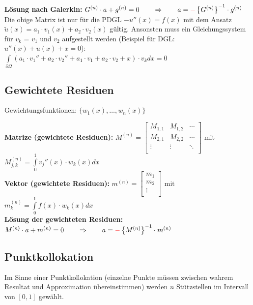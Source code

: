 \textbf{Lösung nach Galerkin:} $G^{(n)}\cdot a+g^{(n)}=0\qquad \Rightarrow
\qquad a=\textcolor{red}{\mathbf{-}}\left\{G^{(n)}\right\}^{-1}\cdot g^{(n)}$\\

Die obige Matrix ist nur für die PDGL $-u''(x) = f(x)$ mit dem Ansatz
$\tilde{u}(x) = a_1 \cdot v_1(x) + a_2 \cdot v_2(x)$ gültig. Ansonsten muss ein
Gleichungssystem für $v_k$ = $v_1$ und $v_2$ aufgestellt werden (Beispiel
für DGL: $u''(x) + u(x) + x = 0$):\\
$\int\limits_{\partial \Omega}{(a_1 \cdot v_1'' + a_2 \cdot v_2'' + a_1 \cdot
v_1 + a_2 \cdot v_2 + x) \cdot v_k dx} = 0$

\subsection{Gewichtete Residuen}
Gewichtungsfunktionen: $\{w_1(x),\ldots,w_n(x)\}$

\textbf{Matrize (gewichtete Residuen): }
$M^{(n)}=\begin{bmatrix}
	M_{1,1}& M_{1,2}&\cdots\\
	M_{2,1}& M_{2,2}&\cdots\\
	\vdots & \vdots &\ddots\\
\end{bmatrix}$ \qquad mit \qquad $M_{j,k}^{(n)}=\int\limits_{0}^{1}{v_j''(x)\cdot w_k(x) dx}$\\
\textbf{Vektor (gewichtete Residuen): } 
$m^{(n)}=\begin{bmatrix}
	m_1\\
	m_2\\
	\vdots\\
\end{bmatrix}$ \qquad mit \qquad $m_{k}^{(n)}=\int\limits_{0}^{1}{f(x)\cdot w_k(x) dx}$\\

\textbf{Lösung der gewichteten Residuen:} $M^{(n)}\cdot a+m^{(n)}=0\qquad \Rightarrow \qquad a=\textcolor{red}{\mathbf{-}}\left\{M^{(n)}\right\}^{-1}\cdot m^{(n)}$

\subsection{Punktkollokation}
Im Sinne einer Punktkollokation (einzelne Punkte müssen zwischen wahrem Resultat und Approximation übereinstimmen) werden $n$ Stützstellen im Intervall von $[0,1]$ gewählt.\\

